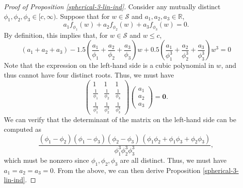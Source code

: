 \documentclass[11pt]{article}
\theoremstyle{definition}
\theoremstyle{remark}
\begin{document}
\begin{proof}[Proof of Proposition \ref{spherical-3-lin-ind}]
Consider any mutually distinct $\phi_1, \phi_2, \phi_3\in [c, \infty)$. 
Suppose 
that 
for $w\in \mathcal{S}$ and $a_1, a_2, a_3\in \mathbb{R}$,  
\begin{equation}\label{eq:spherical-3-lind-zero}
a_1f_{\phi_1}(w) + a_2f_{\phi_2}(w) + a_3f_{\phi_3}(w)=0.
\end{equation} 
By definition, this implies that, for $w\in \mathcal{S}$ and $w\le c$,  
\[(a_1+a_2+a_3) -1.5\left(\frac{a_1}{\phi_1} + \frac{a_2}{\phi_2}+\frac{a_3}{\phi_3} \right)w + 0.5 \left(\frac{a_1}{\phi_1^3} + \frac{a_2}{\phi_2^3}
+\frac{a_3}{\phi_3^3} \right)w^3 =0\]
Note that the expression on the left-hand side is a cubic polynomial in $w$, and thus cannot have four distinct roots. Thus, we must have 
\[\begin{pmatrix} 1 & 1 & 1 \\
\frac{1}{\phi_1} & \frac{1}{\phi_2} & \frac{1}{\phi_3} \\
\frac{1}{\phi_1^3} & \frac{1}{\phi_2^3} & \frac{1}{\phi_3^3}\end{pmatrix} \begin{pmatrix} a_1 \\ a_2 \\ a_3 \end{pmatrix} = \textbf{0}.\]
We can verify that the determinant of the matrix on the left-hand side can be computed as 
\[
\frac{(\phi_1-\phi_2)(\phi_1-\phi_3)(\phi_2-\phi_3)\,(\phi_1\phi_2+\phi_1\phi_3+\phi_2\phi_3)}
{\phi_1^3\phi_2^3\phi_3^3},
\] which must be nonzero since $\phi_1, \phi_2, \phi_3$ are all distinct. Thus, we must have $a_1 = a_2 = a_3 = 0$. 
From the above, we can then derive Proposition \ref{spherical-3-lin-ind}. 
\end{proof}
\end{document}
